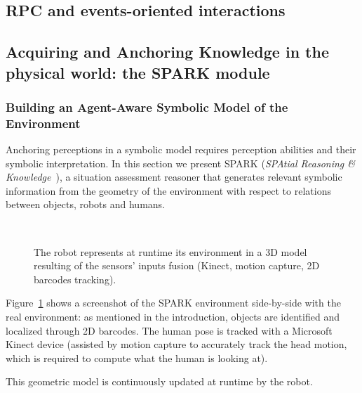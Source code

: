 \subsection{RPC and events-oriented interactions}

\subsection{Acquiring and Anchoring Knowledge in the physical world: the SPARK module}

\subsubsection{Building an Agent-Aware Symbolic Model of the Environment}
\label{sect|situ}

Anchoring perceptions in a symbolic model requires perception abilities and
their symbolic interpretation. In this section we present SPARK (\emph{SPAtial
Reasoning \& Knowledge}~\cite{Sisbot2011}), a situation assessment reasoner
that generates relevant symbolic information from the geometry of the
environment with respect to relations between objects, robots and humans.

\begin{figure}[ht!]
   \begin{center}
%
       \\ %
%
   \end{center}

   \caption{The robot represents at runtime its environment in a 3D model
   resulting of the sensors' inputs fusion (Kinect, motion capture, 2D barcodes
   tracking).}

   \label{fig|spark}

\end{figure}

Figure~\ref{fig|spark} shows a screenshot of the SPARK environment side-by-side
with the real environment: as mentioned in the introduction, objects are
identified and localized through 2D barcodes. The human pose is tracked with
a Microsoft Kinect device (assisted by motion capture to accurately track the
head motion, which is required to compute what the human is looking at).

This geometric model is continuously updated at runtime by the robot.

